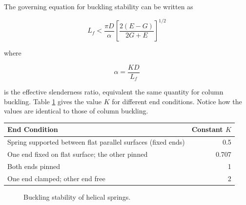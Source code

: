 \documentclass[a4paper,openany,nobib]{tufte-book}
\begin{document}
{{The governing equation for buckling stability can be written as

$$L_f < \frac{\pi D}{\alpha} \left[ \frac{2(E-G)}{2G+E} \right]^{1/2}$$

where

$$\alpha = \frac{KD}{L_f}$$

is the effective slenderness ratio, equivalent the same quantity for
column buckling. Table
\ref{table: spring buckling} gives the value
\(K\) for different end conditions. Notice how the values are identical to
those of column buckling.


\begin{table}[htbp]
\label{table: spring buckling}
\centering
\begin{tabular}{lr}
\toprule
End Condition & Constant \(K\)\\
\midrule
Spring supported between flat parallel surfaces (fixed ends) & 0.5\\
One end fixed on flat surface; the other pinned & 0.707\\
Both ends pinned & 1\\
One end clamped; other end free & 2\\
\bottomrule
\end{tabular}
\end{table}

\begin{figure}[h]
  \centering
  \caption{Buckling stability of helical springs.}
  \label{fig: spring buckling}
\end{figure}

}}
\end{document}
